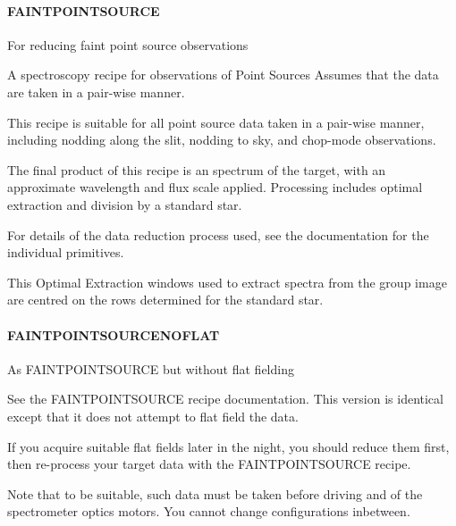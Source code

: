 \documentclass[twoside,11pt]{article}
\renewcommand{\_}{\texttt{\symbol{95}}}
\begin{document}
\paragraph{FAINT\_POINT\_SOURCE\label{FAINT_POINT_SOURCE}}


For reducing faint point source observations


\mbox{}


A spectroscopy recipe for observations of Point Sources
Assumes that the data are taken in a pair-wise manner.



This recipe is suitable for all point source data taken in a pair-wise
manner, including nodding along the slit, nodding to sky, and
chop-mode observations.



The final product of this recipe is an spectrum of the target, with an
approximate wavelength and flux scale applied. Processing includes
optimal extraction and division by a standard star.



For details of the data reduction process used, see the documentation
for the individual primitives.



This Optimal Extraction windows used to extract spectra from the group
image are centred on the rows determined for the standard star.

\paragraph{FAINT\_POINT\_SOURCE\_NOFLAT\label{FAINT_POINT_SOURCE_NOFLAT}}


As FAINT\_POINT\_SOURCE but without flat fielding


\mbox{}


See the FAINT\_POINT\_SOURCE recipe documentation. This version is
identical except that it does not attempt to flat field the data.



If you acquire suitable flat fields later in the night, you should
reduce them first, then re-process your target data with the
FAINT\_POINT\_SOURCE recipe.



Note that to be suitable, such data must be taken before driving and
of the spectrometer optics motors. You cannot change configurations
inbetween.
\end{document}
